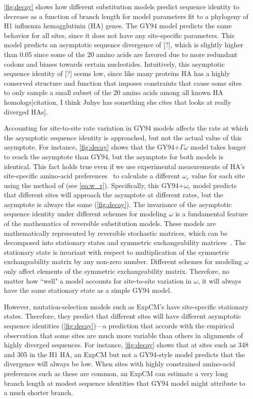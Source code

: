 \documentclass[11pt]{article}
\newcommand\jdbcomment[1]{{\color{red}[#1]}}
\begin{document}
\ref{fig:decay} shows how different substitution models predict sequence identity to decrease as a function of branch length for model parameters fit to a phylogeny of H1 influenza hemagglutinin (HA) genes.
The GY94 model predicts the same behavior for all sites, since it does not have any site-specific parameters.
This model predicts an asymptotic sequence divergence of \jdbcomment{?}, which is slightly higher than 0.05 since some of the 20 amino acids are favored due to more redundant codons and biases towards certain nucleotides.
Intuitively, this asymptotic sequence identity of \jdbcomment{?} seems low, since like many proteins HA has a highly conserved structure and function that imposes constraints that cause some sites to only sample a small subset of the 20 amino acids among all known HA homologs\jdbcomment{citation, I think Juhye has something she cites that looks at really diverged HAs}.

Accounting for site-to-site rate variation in GY94 models affects the rate at which the asymptotic sequence identity is approached, but not the actual value of this asymptote. 
For instance, \ref{fig:decay} shows that the GY94+$\Gamma\omega$ model takes longer to reach the asymptote than GY94, but the asymptote for both models is identical. 
This fact holds true even if we use experimental measurements of HA's site-specific amino-acid preferences~\citep{doud2016accurate} to calculate a different $\omega_r$ value for each site using the method of \citet{spielman2015relationship} (see \ref{eq:w_r}).
Specifically, this GY94+$\omega_r$ model predicts that different sites will approach the asymptote at different rates, but the asymptote is always the same (\ref{fig:decay}).
The invariance of the asymptotic sequence identity under different schemes for modeling $\omega$ is a fundamental feature of the mathematics of reversible substitution models.
These models are mathematically represented by reversible stochastic matrices, which can be decomposed into stationary states and symmetric exchangeability matrices~\citep{nielsen2006statistical}.
The stationary state is invariant with respect to multiplication of the symmetric exchangeability matrix by any non-zero number.
Different schemes for modeling $\omega$ only affect elements of the symmetric exchangeability matrix.
Therefore, no matter how ``well" a model accounts for site-to-site variation in $\omega$, it will always have the same stationary state as a simple GY94 model. 

However, mutation-selection models such as ExpCM's have site-specific stationary states.
Therefore, they predict that different sites will have different asymptotic sequence identities (\ref{fig:decay})---a prediction that accords with the empirical observation that some sites are much more variable than others in alignments of highly diverged sequences.
For instance, \ref{fig:decay} shows that at sites such as 348 and 305 in the H1 HA, an ExpCM but not a GY94-style model predicts that the divergence will always be low. 
When sites with highly constrained amino-acid preferences such as these are common, an ExpCM can estimate a very long branch length at modest sequence identities that GY94 model might attribute to a much shorter branch.
\end{document}
